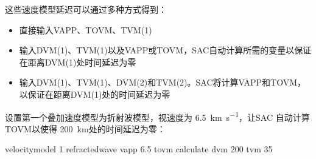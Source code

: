 这些速度模型延迟可以通过多种方式得到：
\begin{itemize}
\item 直接输入VAPP、TOVM、TVM(1)
\item 输入DVM(1)、TVM(1)以及VAPP或TOVM，SAC自动计算所需的变量以保证在距离DVM(1)处时间延迟为零
\item 输入DVM(1)、TVM(1)、DVM(2)和TVM(2)。SAC将计算VAPP和TOVM，以保证在距离DVM(1)处的时间延迟为零
\end{itemize}

设置第一个叠加速度模型为折射波模型，视速度为 \SI{6.5}{\km\per\s}，让SAC
自动计算TOVM以使得 \SI{200}{\km}处的时间延迟为零：
\begin{SACCode}
velocitymodel 1 refractedwave vapp 6.5 tovm calculate dvm 200 tvm 35
\end{SACCode}
